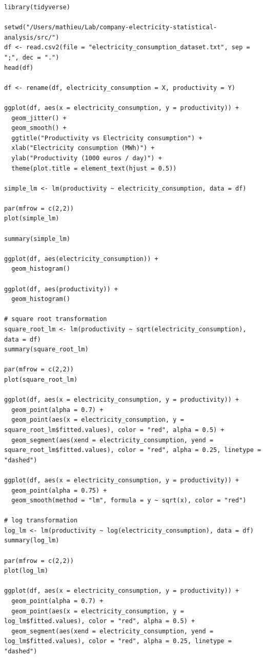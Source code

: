 \begin{verbatim}
library(tidyverse)

setwd("/Users/mathieu/Lab/company-electricity-statistical-analysis/src/")
df <- read.csv2(file = "electricity_consumption_dataset.txt", sep = ";", dec = ".")
head(df)

df <- rename(df, electricity_consumption = X, productivity = Y)

ggplot(df, aes(x = electricity_consumption, y = productivity)) +
  geom_jitter() +
  geom_smooth() +
  ggtitle("Productivity vs Electricity consumption") +
  xlab("Electricity consumption (MWh)") +
  ylab("Productivity (1000 euros / day)") + 
  theme(plot.title = element_text(hjust = 0.5))

simple_lm <- lm(productivity ~ electricity_consumption, data = df)

par(mfrow = c(2,2))
plot(simple_lm)

summary(simple_lm)

ggplot(df, aes(electricity_consumption)) +
  geom_histogram()

ggplot(df, aes(productivity)) +
  geom_histogram()

# square root transformation
square_root_lm <- lm(productivity ~ sqrt(electricity_consumption), data = df)
summary(square_root_lm)

par(mfrow = c(2,2))
plot(square_root_lm)

ggplot(df, aes(x = electricity_consumption, y = productivity)) +
  geom_point(alpha = 0.7) +
  geom_point(aes(x = electricity_consumption, y = square_root_lm$fitted.values), color = "red", alpha = 0.5) +
  geom_segment(aes(xend = electricity_consumption, yend = square_root_lm$fitted.values), color = "red", alpha = 0.25, linetype = "dashed")

ggplot(df, aes(x = electricity_consumption, y = productivity)) + 
  geom_point(alpha = 0.75) +
  geom_smooth(method = "lm", formula = y ~ sqrt(x), color = "red")

# log transformation
log_lm <- lm(productivity ~ log(electricity_consumption), data = df)
summary(log_lm)

par(mfrow = c(2,2))
plot(log_lm)

ggplot(df, aes(x = electricity_consumption, y = productivity)) +
  geom_point(alpha = 0.7) +
  geom_point(aes(x = electricity_consumption, y = log_lm$fitted.values), color = "red", alpha = 0.5) +
  geom_segment(aes(xend = electricity_consumption, yend = log_lm$fitted.values), color = "red", alpha = 0.25, linetype = "dashed")


\end{verbatim}

